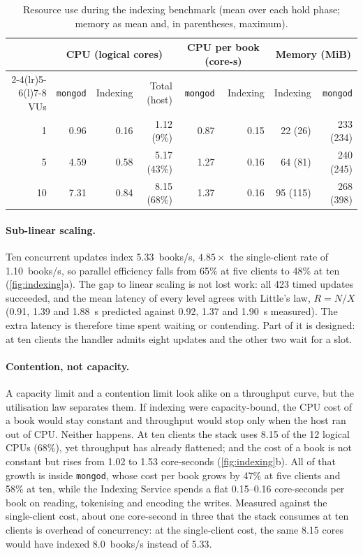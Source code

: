 \documentclass[10pt,a4paper]{article}
\newcommand{\code}[1]{\texttt{#1}}
\begin{document}
\begin{table}[htbp]
  \centering
  \footnotesize
  \caption{Resource use during the indexing benchmark (mean over each hold
  phase; memory as mean and, in parentheses, maximum).}
  \label{tab:indexing-resources}
  \begin{tabular}{@{}rrrrrrrr@{}}
    \toprule
    & \multicolumn{3}{c}{CPU (logical cores)} & \multicolumn{2}{c}{CPU per book (core-s)} & \multicolumn{2}{c}{Memory (MiB)} \\
    \cmidrule(lr){2-4}\cmidrule(lr){5-6}\cmidrule(l){7-8}
    VUs & \code{mongod} & Indexing & Total (host) & \code{mongod} & Indexing & Indexing & \code{mongod} \\
    \midrule
    1  & 0.96 & 0.16 & 1.12 (9\%)  & 0.87 & 0.15 & 22 (26)  & 233 (234) \\
    5  & 4.59 & 0.58 & 5.17 (43\%) & 1.27 & 0.16 & 64 (81)  & 240 (245) \\
    10 & 7.31 & 0.84 & 8.15 (68\%) & 1.37 & 0.16 & 95 (115) & 268 (398) \\
    \bottomrule
  \end{tabular}
\end{table}

\paragraph{Sub-linear scaling.}
Ten concurrent updates index 5.33~books/s, $4.85\times$ the single-client rate
of 1.10~books/s, so parallel efficiency falls from 65\% at five clients to
48\% at ten (\cref{fig:indexing}a). The gap to linear scaling is not lost work:
all 423 timed updates succeeded, and the mean latency of every level agrees
with Little's law, $R = N/X$ (0.91, 1.39 and 1.88~s predicted against 0.92,
1.37 and 1.90~s measured). The extra latency is therefore time spent waiting
or contending. Part of it is designed: at ten clients the handler admits eight
updates and the other two wait for a slot.

\paragraph{Contention, not capacity.}
A capacity limit and a contention limit look alike on a throughput curve, but
the utilisation law separates them. If indexing were capacity-bound, the CPU
cost of a book would stay constant and throughput would stop only when the
host ran out of CPU. Neither happens. At ten clients the stack uses 8.15 of
the 12 logical CPUs (68\%), yet throughput has already flattened; and the cost
of a book is not constant but rises from 1.02 to 1.53 core-seconds
(\cref{fig:indexing}b). All of that growth is inside \code{mongod}, whose cost
per book grows by 47\% at five clients and 58\% at ten, while the Indexing
Service spends a flat 0.15--0.16 core-seconds per book on reading, tokenising
and encoding the writes. Measured against the single-client cost, about one
core-second in three that the stack consumes at ten clients is overhead of
concurrency: at the single-client cost, the same 8.15 cores would have indexed
8.0~books/s instead of 5.33.
\end{document}
